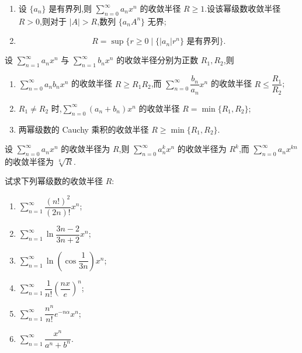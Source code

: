 \begin{proposition}[\markstar]
    \leavevmode
    \begin{enumerate}
        \item 设 $\{a_n\}$ 是有界列,则 $\displaystyle\sum\limits_{n=0}^{\infty}a_nx^n$ 的收敛半径 $R\geq1$.设该幂级数收敛半径 $R>0$,则对于 $|A|>R$,数列 $\{a_nA^n\}$ 无界;
        \item
              \[
                  R=\sup\{r\geq0\mid \{|a_n|r^n\}\text{ 是有界列}\}.
              \]
    \end{enumerate}
\end{proposition}

\begin{proposition}[\markstar]
    设 $\displaystyle\sum\limits_{n=1}^{\infty}a_nx^n$ 与 $\displaystyle\sum\limits_{n=1}^{\infty}b_nx^n$ 的收敛半径分别为正数 $R_1,R_2$,则
    \begin{enumerate}
        \item $\displaystyle\sum\limits_{n=0}^{\infty}a_nb_nx^n$ 的收敛半径 $R\geq R_1R_2$,而 $\displaystyle\sum\limits_{n=0}^{\infty}\dfrac{b_n}{a_n}x^n$ 的收敛半径 $R\leq\dfrac{R_1}{R_2}$;
        \item $R_1\neq R_2$ 时,$\displaystyle\sum\limits_{n=0}^{\infty}(a_n+b_n)x^n$ 的收敛半径 $R=\min\{R_1,R_2\}$;
        \item 两幂级数的 Cauchy 乘积的收敛半径 $R\geq\min\{R_1,R_2\}$.
    \end{enumerate}
\end{proposition}

\begin{proposition}[\markstar]
    设 $\displaystyle\sum\limits_{n=0}^{\infty}a_nx^n$ 的收敛半径为 $R$,则 $\displaystyle\sum\limits_{n=0}^{\infty}a_n^kx^n$ 的收敛半径为 $R^k$,而 $\displaystyle\sum\limits_{n=0}^{\infty}a_nx^{kn}$ 的收敛半径为 $\sqrt[k]{R}$.
\end{proposition}

\begin{example}
    试求下列幂级数的收敛半径 $R$:
    \begin{enumerate}
        \item $\displaystyle\sum\limits_{n=1}^{\infty}\dfrac{(n!)^2}{(2n)!}x^n$;
        \item $\displaystyle\sum\limits_{n=1}^{\infty}\ln\dfrac{3n-2}{3n+2}x^n$;
        \item $\displaystyle\sum\limits_{n=1}^{\infty}\ln\left(\cos\dfrac{1}{3n}\right)x^n$;
        \item $\displaystyle\sum\limits_{n=1}^{\infty}\dfrac{1}{n!}\left(\dfrac{nx}{e}\right)^n$;
        \item $\displaystyle\sum\limits_{n=1}^{\infty}\dfrac{n^n}{n!}e^{-n\alpha}x^n$;
        \item $\displaystyle\sum\limits_{n=1}^{\infty}\dfrac{x^n}{a^n+b^n}$.
    \end{enumerate}
\end{example}
\exampleblank


